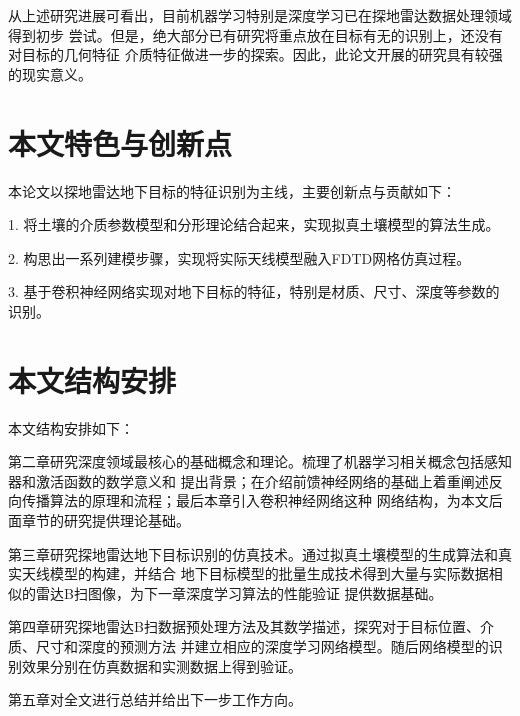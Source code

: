 从上述研究进展可看出，目前机器学习特别是深度学习已在探地雷达数据处理领域得到初步
尝试。但是，绝大部分已有研究将重点放在目标有无的识别上，还没有对目标的几何特征
介质特征做进一步的探索。因此，此论文开展的研究具有较强的现实意义。
\section{本文特色与创新点}
本论文以探地雷达地下目标的特征识别为主线，主要创新点与贡献如下：

1. 将土壤的介质参数模型和分形理论结合起来，实现拟真土壤模型的算法生成。

2. 构思出一系列建模步骤，实现将实际天线模型融入FDTD网格仿真过程。

3. 基于卷积神经网络实现对地下目标的特征，特别是材质、尺寸、深度等参数的识别。
\section{本文结构安排}
本文结构安排如下：

第二章研究深度领域最核心的基础概念和理论。梳理了机器学习相关概念包括感知器和激活函数的数学意义和
提出背景；在介绍前馈神经网络的基础上着重阐述反向传播算法的原理和流程；最后本章引入卷积神经网络这种
网络结构，为本文后面章节的研究提供理论基础。

第三章研究探地雷达地下目标识别的仿真技术。通过拟真土壤模型的生成算法和真实天线模型的构建，并结合
地下目标模型的批量生成技术得到大量与实际数据相似的雷达B扫图像，为下一章深度学习算法的性能验证
提供数据基础。

第四章研究探地雷达B扫数据预处理方法及其数学描述，探究对于目标位置、介质、尺寸和深度的预测方法
并建立相应的深度学习网络模型。随后网络模型的识别效果分别在仿真数据和实测数据上得到验证。

第五章对全文进行总结并给出下一步工作方向。
